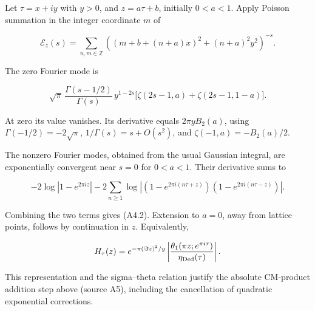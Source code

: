 Let \(\tau=x+iy\) with \(y>0\), and \(z=a\tau+b\), initially \(0<a<1\).
Apply Poisson summation in the integer coordinate \(m\) of

\[
\mathcal E_z(s)=\sum_{n,m\in\mathbb Z}
\left((m+b+(n+a)x)^2+(n+a)^2y^2\right)^{-s}.
\]

The zero Fourier mode is

\[
\sqrt\pi\,\frac{\Gamma(s-1/2)}{\Gamma(s)}\,
 y^{1-2s}\bigl[\zeta(2s-1,a)+\zeta(2s-1,1-a)\bigr].
\]

At zero its value vanishes. Its derivative equals \(2\pi y B_2(a)\),
using \(\Gamma(-1/2)=-2\sqrt\pi\), \(1/\Gamma(s)=s+O(s^2)\), and
\(\zeta(-1,a)=-B_2(a)/2\).

The nonzero Fourier modes, obtained from the usual Gaussian integral,
are exponentially convergent near \(s=0\) for \(0<a<1\). Their
derivative sums to

\[
-2\log|1-e^{2\pi iz}|
-2\sum_{n\ge1}\log|(1-e^{2\pi i(n\tau+z)})(1-e^{2\pi i(n\tau-z)})|.
\]

Combining the two terms gives (A4.2). Extension to \(a=0\), away from
lattice points, follows by continuation in \(z\). Equivalently,

\[
H_\tau(z)=e^{-\pi(\Im z)^2/y}
\left|\frac{\theta_1(\pi z;e^{\pi i\tau})}{\eta_{\rm Ded}(\tau)}\right|.
\]

This representation and the sigma--theta relation justify the absolute
CM-product addition step above (source A5), including the cancellation of quadratic
exponential corrections.
